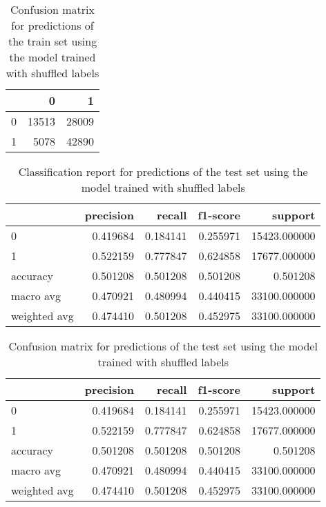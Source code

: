 \documentclass{article}
\begin{document}
{\begin{itemize}
\begin{table}[h!]
\centering
\begin{tabular}{lrr}
\toprule
{} &      0 &      1 \\
\midrule
0 &  13513 &  28009 \\
1 &   5078 &  42890 \\
\bottomrule
\end{tabular}

\caption{Confusion matrix for predictions of the train set using the model trained with shuffled labels}
\label{table:model1_tr_sh_cm}
\end{table}

\begin{table}[h!]
\centering
\begin{tabular}{lrrrr}
\toprule
{} &  precision &    recall &  f1-score &       support \\
\midrule
0            &   0.419684 &  0.184141 &  0.255971 &  15423.000000 \\
1            &   0.522159 &  0.777847 &  0.624858 &  17677.000000 \\
accuracy     &   0.501208 &  0.501208 &  0.501208 &      0.501208 \\
macro avg    &   0.470921 &  0.480994 &  0.440415 &  33100.000000 \\
weighted avg &   0.474410 &  0.501208 &  0.452975 &  33100.000000 \\
\bottomrule
\end{tabular}
\caption{Classification report for predictions of the test set using the model trained with shuffled labels}
\label{table:model1_te_sh_cr}
\end{table}
 
\begin{table}[h!]
\centering
\begin{tabular}{lrrrr}
\toprule
{} &  precision &    recall &  f1-score &       support \\
\midrule
0            &   0.419684 &  0.184141 &  0.255971 &  15423.000000 \\
1            &   0.522159 &  0.777847 &  0.624858 &  17677.000000 \\
accuracy     &   0.501208 &  0.501208 &  0.501208 &      0.501208 \\
macro avg    &   0.470921 &  0.480994 &  0.440415 &  33100.000000 \\
weighted avg &   0.474410 &  0.501208 &  0.452975 &  33100.000000 \\
\bottomrule
\end{tabular}
\caption{Confusion matrix for predictions of the test set using the model trained with shuffled labels}
\label{table:model1_te_sh_cm}
\end{table}


\end{itemize}}
\end{document}
